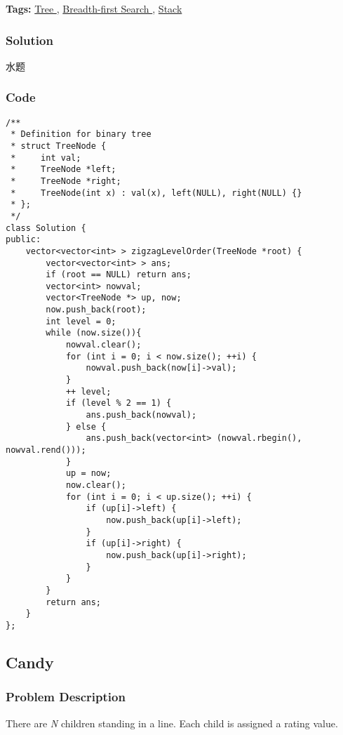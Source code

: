 \documentclass{article}
\begin{document}
\begin{CJK*}{UTF8}{gkai}
\textbf{Tags: }
\hyperref[ Tree ]{ Tree },  \hyperref[ Breadth-first Search ]{ Breadth-first Search },  \hyperref[ Stack ]{ Stack }



\subsubsection*{Solution}
水题

\subsubsection*{Code}
\begin{lstlisting}
/**
 * Definition for binary tree
 * struct TreeNode {
 *     int val;
 *     TreeNode *left;
 *     TreeNode *right;
 *     TreeNode(int x) : val(x), left(NULL), right(NULL) {}
 * };
 */
class Solution {
public:
    vector<vector<int> > zigzagLevelOrder(TreeNode *root) {
        vector<vector<int> > ans;
        if (root == NULL) return ans;
        vector<int> nowval;
        vector<TreeNode *> up, now;
        now.push_back(root);
        int level = 0;
        while (now.size()){
            nowval.clear();
            for (int i = 0; i < now.size(); ++i) {
                nowval.push_back(now[i]->val);
            }
            ++ level;
            if (level % 2 == 1) {
                ans.push_back(nowval);
            } else {
                ans.push_back(vector<int> (nowval.rbegin(), nowval.rend()));
            }
            up = now;
            now.clear();
            for (int i = 0; i < up.size(); ++i) {
                if (up[i]->left) {
                    now.push_back(up[i]->left);
                }
                if (up[i]->right) {
                    now.push_back(up[i]->right);
                }
            }
        }
        return ans;
    }
}; 
\end{lstlisting}


\subsection{ Candy }
\label{ Candy }

\subsubsection*{Problem Description}
There are \emph{N} children standing in a line. Each child is assigned a rating value.


\end{CJK*}
\end{document}
